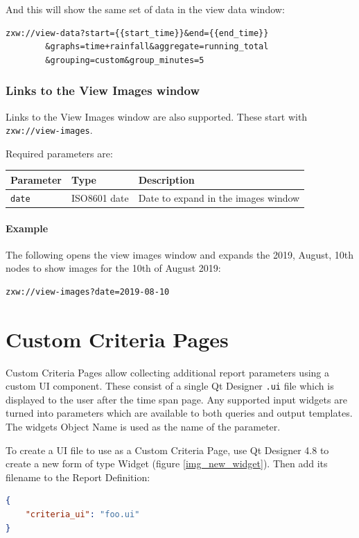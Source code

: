 \documentclass[a4paper,10pt]{book}
\begin{document}
And this will show the same set of data in the view data window:
\begin{verbatim}
zxw://view-data?start={{start_time}}&end={{end_time}}
        &graphs=time+rainfall&aggregate=running_total
        &grouping=custom&group_minutes=5
\end{verbatim}


\subsection{Links to the View Images window}
Links to the View Images window are also supported. These start with \verb|zxw://view-images|.

Required parameters are:

\begin{tabular}{p{3.5cm} p{2.5cm} p{7.6cm}}
\hline
\textbf{Parameter} & \textbf{Type} & \textbf{Description} \\
\hline
\verb|date| & ISO8601 date & Date to expand in the images window \\
\hline
\end{tabular}

\subsubsection{Example}
The following opens the view images window and expands the 2019, August, 10th nodes to show images for the 10th of August 2019:
\begin{verbatim}
zxw://view-images?date=2019-08-10
\end{verbatim}


\chapter{Custom Criteria Pages}
Custom Criteria Pages allow collecting additional report parameters using a custom UI component. These consist of a single Qt Designer \verb|.ui| file which is displayed to the user after the time span page. Any supported input widgets are turned into parameters which are available to both queries and output templates. The widgets Object Name is used as the name of the parameter.

To create a UI file to use as a Custom Criteria Page, use Qt Designer 4.8 to create a new form of type Widget (figure \ref{img_new_widget}). Then add its filename to the Report Definition:

\begin{lstlisting}[language=json]
{
    "criteria_ui": "foo.ui"
}
\end{lstlisting}
\end{document}
